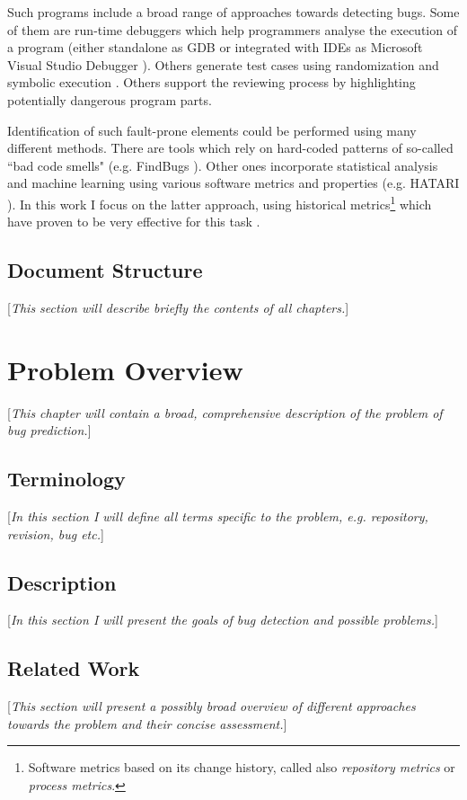 \documentclass{pracamgr}
\begin{document}
Such programs include a broad range of approaches towards detecting bugs. Some of them are run-time debuggers which help programmers analyse the execution of a program (either standalone as GDB \cite{gdb} or integrated with IDEs as Microsoft Visual Studio Debugger \cite{vs_debugger}). Others generate test cases using randomization and symbolic execution \cite{symbolic, puzzle}. Others support the reviewing process by highlighting potentially dangerous program parts.

Identification of such fault-prone elements could be performed using many different methods. There are tools which rely on hard-coded patterns of so-called ``bad code smells" (e.g. FindBugs \cite{findbugs}). Other ones incorporate statistical analysis and machine learning using various software metrics and properties (e.g. HATARI \cite{hatari}). In this work I focus on the latter approach, using historical metrics\footnote{Software metrics based on its change history, called also \textit{repository metrics} or \textit{process metrics}.} which have proven to be very effective for this task \cite{merits, comparative, how_and_why}.

\section{Document Structure}
[\textit{This section will describe briefly the contents of all chapters.}]

\chapter{Problem Overview}
[\textit{This chapter will contain a broad, comprehensive description of the problem of bug prediction.}]

\section{Terminology}
[\textit{In this section I will define all terms specific to the problem, e.g. repository, revision, bug etc.}]

\section{Description}
[\textit{In this section I will present the goals of bug detection and possible problems.}]

\section{Related Work}
[\textit{This section will present a possibly broad overview of different approaches towards the problem and their concise assessment.}]
\end{document}

